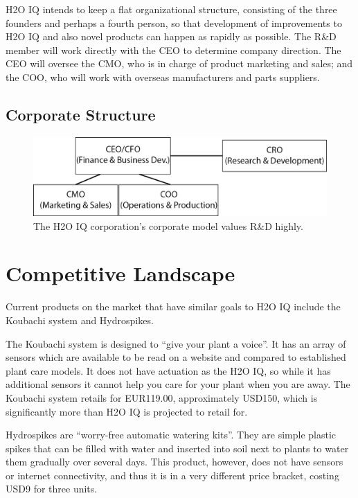 \documentclass[11pt]{article}
\begin{document}
H2O IQ intends to keep a flat organizational structure, consisting of the three founders and perhaps a fourth person, so that development of improvements to H2O IQ and also novel products can happen as rapidly as possible.  The R\&D member will work directly with the CEO to determine company direction.  The CEO will oversee the CMO, who is in charge of product marketing and sales; and the COO, who will work with overseas manufacturers and parts suppliers.

\subsection{Corporate Structure}

\begin{figure}[h!]
\begin{center}
\includegraphics[width=5.5in]{./pngs/organizational-model.png}
\end{center}
\caption{The H2O IQ corporation's corporate model values R\&D highly.}
\label{fig:structure}
\end{figure}

\section{Competitive Landscape}

Current products on the market that have similar goals to H2O IQ include the Koubachi system and Hydrospikes.

The Koubachi system is designed to ``give your plant a voice''.  It has an array of sensors which are available to be read on a website and compared to established plant care models.  It does not have actuation as the H2O IQ, so while it has additional sensors it cannot help you care for your plant when you are away.  The Koubachi system retails for EUR119.00, approximately USD150, which is significantly more than H2O IQ is projected to retail for.

Hydrospikes are ``worry-free automatic watering kits''.  They are simple plastic spikes that can be filled with water and inserted into soil next to plants to water them gradually over several days.  This product, however, does not have sensors or internet connectivity, and thus it is in a very different price bracket, costing USD9 for three units.
\end{document}
